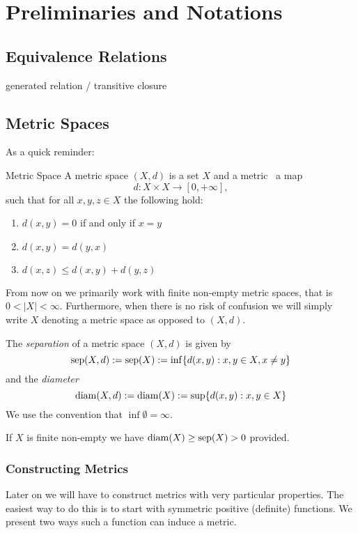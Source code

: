 \chapter{Preliminaries and Notations}

\section{Equivalence Relations}
\begin{definition}{generated relation / transitive closure}{}
\end{definition}

\section{Metric Spaces}
As a quick reminder:
\begin{definition}{Metric Space}{}
A metric space $(X,d)$ is a set $X$ and a metric \Ie\ a map
\begin{equation*}
d: X \times X \to [0, +\infty],
\end{equation*}
such that for all $x,y,z \in X$ the following hold:
\begin{enumerate}
    \item $d(x,y) = 0$ if and only if $x = y$
    \item $d(x,y) = d(y,x)$
    \item $d(x,z) \leq d(x,y) + d(y,z)$
\end{enumerate}
\end{definition}
From now on we primarily work with finite non-empty metric spaces, that is $0 < |X| < \infty$.
Furthermore, when there is no risk of confusion we will simply write $X$ denoting a metric space as opposed to $(X,d)$.

\begin{definition}{}{}
The \emph{separation} of a metric space $(X,d)$ is given by
\begin{equation*}
\mathrm{sep}(X,d) := \mathrm{sep}(X) := \inf\{d(x,y): x,y \in X, x \neq y\}
\end{equation*}
and the \emph{diameter}
\begin{equation*}
\mathrm{diam}(X,d) := \mathrm{diam}(X) := \sup\{d(x,y): x,y \in X\}
\end{equation*}
We use the convention that $\inf \emptyset = \infty$. 
\end{definition}

If $X$ is finite non-empty we have $\mathrm{diam}(X) \geq \mathrm{sep}(X) > 0$ provided.

\subsection{Constructing Metrics}
Later on we will have to construct metrics with very particular properties. The easiest way to do this is to start with symmetric positive (definite) functions. We present two ways such a function can induce a metric.

